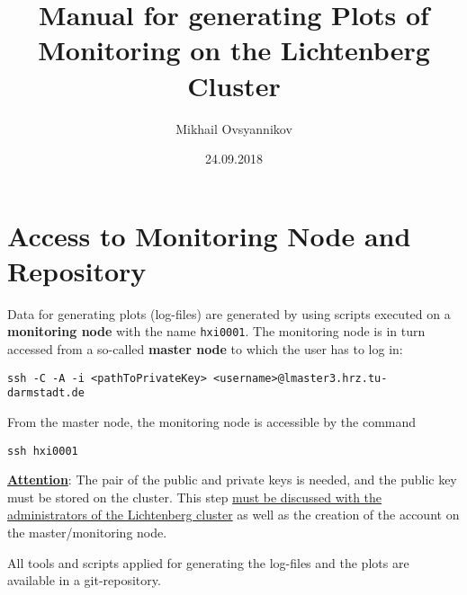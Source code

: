 \documentclass[12pt,a4paper,onecolumn]{article}
\begin{document}

\title{\huge Manual for generating Plots of Monitoring on the Lichtenberg Cluster}
\author{Mikhail Ovsyannikov}
\date{24.09.2018}
\maketitle

\newpage

\tableofcontents

\newpage


\section{Access to Monitoring Node and Repository}
\label{sec:access_monitor_tools}


Data for generating plots (log-files) are generated by using scripts executed on a \textbf{monitoring node} with the name \lstinline{hxi0001}.
The monitoring node is in turn accessed from a so-called \textbf{master node} to which the user has to log in:
\begin{lstlisting}
ssh -C -A -i <pathToPrivateKey> <username>@lmaster3.hrz.tu-darmstadt.de
\end{lstlisting}
From the master node, the monitoring node is accessible by the command
\begin{lstlisting}
ssh hxi0001
\end{lstlisting}

\vspace{\baselineskip}

\underline{\textbf{Attention}}: The pair of the public and private keys is needed, and the public key must be stored on the cluster.
This step \ul{must be discussed with the administrators of the Lichtenberg cluster} as well as the creation of the account on the master/monitoring node.
\vspace{\baselineskip}

All tools and scripts applied for generating the log-files and the plots are available in a git-repository.
\vspace{\baselineskip}
\end{document}
